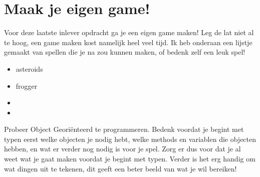 \documentclass{../qh_assignment}
\begin{document}
\section{Maak je eigen game!}
Voor deze laatste inlever opdracht ga je een eigen game maken! Leg de lat niet al te hoog, een game maken kost namelijk heel veel tijd. Ik heb onderaan een lijstje gemaakt van spellen die je na zou kunnen maken, of bedenk zelf een leuk spel!
\begin{itemize}
    \item asteroids
    \item frogger
    \item {}
    \item {}
\end{itemize}

Probeer Object Geori\"enteerd te programmeren. Bedenk voordat je begint met typen eerst welke objecten je nodig hebt, welke methods en variablen die objecten hebben, en wat er verder nog nodig is voor je spel. Zorg er dus voor dat je al weet wat je gaat maken voordat je begint met typen. Verder is het erg handig om wat dingen uit te tekenen, dit geeft een beter beeld van wat je wil bereiken!
\end{document}
